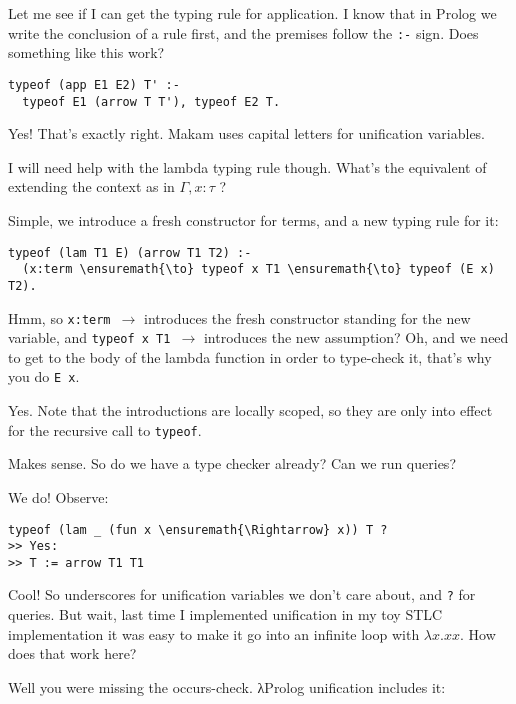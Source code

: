 \heroSTUDENT{} Let me see if I can get the typing rule for application. I know
that in Prolog we write the conclusion of a rule first, and the premises
follow the \texttt{:-} sign. Does something like this work?

\begin{verbatim}
typeof (app E1 E2) T' :-
  typeof E1 (arrow T T'), typeof E2 T.
\end{verbatim}

\heroADVISOR{} Yes! That's exactly right. Makam uses capital letters for
unification variables.

\heroSTUDENT{} I will need help with the lambda typing rule though. What's the
equivalent of extending the context as in \(\Gamma, x : \tau\) ?

\heroADVISOR{} Simple, we introduce a fresh constructor for terms, and a new
typing rule for it:

\begin{verbatim}
typeof (lam T1 E) (arrow T1 T2) :-
  (x:term \ensuremath{\to} typeof x T1 \ensuremath{\to} typeof (E x) T2).
\end{verbatim}

\heroSTUDENT{} Hmm, so \texttt{x:term\ \ensuremath{\to}} introduces the fresh
constructor standing for the new variable, and
\texttt{typeof\ x\ T1\ \ensuremath{\to}} introduces the new assumption?
Oh, and we need to get to the body of the lambda function in order to
type-check it, that's why you do \texttt{E\ x}.

\heroADVISOR{} Yes. Note that the introductions are locally scoped, so they
are only into effect for the recursive call to \texttt{typeof}.

\heroSTUDENT{} Makes sense. So do we have a type checker already? Can we run
queries?

\heroADVISOR{} We do! Observe:

\begin{verbatim}
typeof (lam _ (fun x \ensuremath{\Rightarrow} x)) T ?
>> Yes:
>> T := arrow T1 T1
\end{verbatim}

\heroSTUDENT{} Cool! So underscores for unification variables we don't care
about, and \texttt{?} for queries. But wait, last time I implemented
unification in my toy STLC implementation it was easy to make it go into
an infinite loop with \(\lambda x. x x\). How does that work here?

\heroADVISOR{} Well you were missing the occurs-check. \foreignlanguage{greek}{λ}Prolog unification
includes it:

